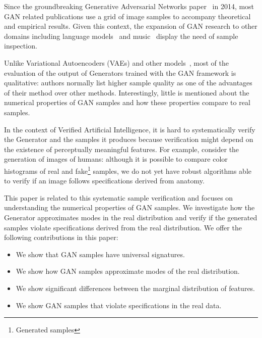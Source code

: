 Since the groundbreaking Generative Adversarial Networks
paper~\cite{goodfellow2014generative} in 2014, most GAN related
publications use a grid of image samples to accompany theoretical and empirical
results. Given this context, the expansion of GAN research to other domains including language 
models~\cite{gulrajani2017improved} and music~\cite{yang2017midigan} display the
need of sample inspection.

Unlike Variational Autoencoders (VAEs) and other
models~\cite{goodfellow2014generative}, most of the evaluation of the output
of Generators trained with the GAN framework is qualitative: authors normally 
list higher sample quality as one of the advantages of their method over other
methods.  Interestingly, little is mentioned about the numerical properties of
GAN samples and how these properties compare to real samples.

In the context of Verified Artificial Intelligence\cite{seshia2016vai}, 
it is hard to systematically verify the Generator and the samples it produces
because verification might depend on the existence of perceptually meaningful features. For example, consider the 
generation of images of humans: although it is possible to compare color histograms 
of real and fake\footnote{Generated samples} samples, we do not yet have robust 
algorithms able to verify if an image follows specifications derived from anatomy. 

This paper is related to this systematic sample verification and focuses on
understanding the numerical properties of GAN samples. We investigate how the
Generator approximates modes 
in the real distribution and verify if the generated samples violate specifications 
derived from the real distribution. We offer the following contributions in this paper: 
\begin{itemize}
\item We show that GAN samples have universal signatures.
\item We show how GAN samples approximate modes of the real distribution.
\item We show significant differences between the marginal distribution of features. 
\item We show GAN samples that violate specifications in the real data.
\end{itemize}
